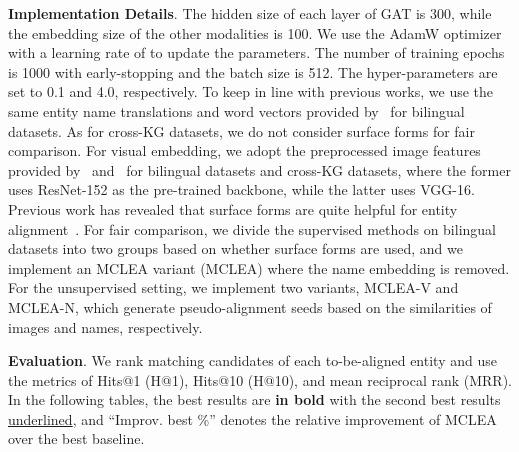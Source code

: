 \documentclass[11pt]{article}
\begin{document}
\noindent\textbf{Implementation Details}.
The hidden size of each layer of GAT is 300, while the embedding size of the other modalities is 100. We use the AdamW optimizer with a learning rate of  to update the parameters. The number of training epochs is 1000 with early-stopping and the batch size is 512. The hyper-parameters  are set to 0.1 and 4.0, respectively. 
To keep in line with previous works, we use the same entity name translations and word vectors provided by~\citet{xu2019cross} for bilingual datasets.
As for cross-KG datasets, we do not consider surface forms for fair comparison.
For visual embedding, we adopt the preprocessed image features provided by~\citet{liu2021visual} and~\citet{chen2020mmea} for bilingual datasets and cross-KG datasets, where the former uses ResNet-152 as the pre-trained backbone, while the latter uses VGG-16.
Previous work has revealed that surface forms are quite helpful for entity alignment~\cite{liu2020exploring}. For fair comparison, we divide the supervised methods on bilingual datasets into two groups based on whether surface forms are used, and we implement an MCLEA variant (MCLEA) where the name embedding is removed.
For the unsupervised setting, we implement two variants, MCLEA-V and MCLEA-N, which generate pseudo-alignment seeds based on the similarities of images and names, respectively.

\noindent\textbf{Evaluation}.
We rank matching candidates of each to-be-aligned entity and use the metrics of Hits@1 (H@1), Hits@10 (H@10), and mean reciprocal rank (MRR).
In the following tables, the best results are \textbf{in bold} with the second best results \underline{underlined}, and ``Improv. best \%'' denotes the relative improvement of MCLEA over the best baseline.
\end{document}
